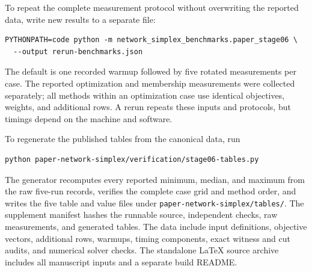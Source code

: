 To repeat the complete measurement protocol without overwriting the
reported data, write new results to a separate file:
\begin{verbatim}
PYTHONPATH=code python -m network_simplex_benchmarks.paper_stage06 \
  --output rerun-benchmarks.json
\end{verbatim}
The default is one recorded warmup followed by five rotated measurements
per case. The reported optimization and membership measurements were
collected separately; all methods within an optimization case use identical
objectives, weights, and additional rows. A rerun repeats these inputs and
protocols, but timings depend on the machine and software.

To regenerate the published tables from the canonical data, run
\begin{verbatim}
python paper-network-simplex/verification/stage06-tables.py
\end{verbatim}
The generator recomputes every reported minimum, median, and maximum from
the raw five-run records, verifies the complete case grid and method order,
and writes the five table and value files under
\texttt{paper-network-simplex/tables/}. The supplement manifest hashes the
runnable source, independent checks, raw measurements, and generated tables.
The data include input definitions, objective vectors, additional rows,
warmups, timing components, exact witness and cut audits, and numerical solver
checks. The standalone LaTeX source archive includes all manuscript inputs
and a separate build README.
